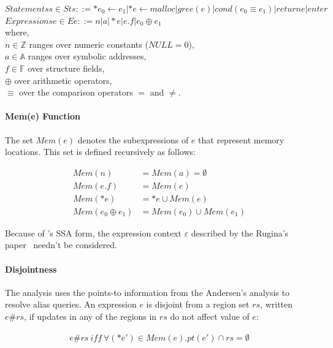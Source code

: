 $Statements s\in St s::= *e_0\gets e_1 | *e\gets malloc | gree(e) | 
cond(e_0\equiv e_1) | return e | enter$ \\

$Expressions e\in E e::= n | a | *e | e.f | e_0 \oplus e_1 $ \\

where, \\
$n\in \mathbb{Z}$ ranges over numeric constants ($NULL=0$), \\
$a\in \mathbb{A}$ ranges over symbolic addresses, \\
$f\in \mathbb{F}$ over structure fields, \\
$\oplus$ over arithmetic operators, \\
$\equiv$ over the comparison operators $=$ and $\ne$.

\paragraph{Mem(e) Function} 

The set $Mem(e)$ denotes the subexpressions of $e$ that represent memory 
locations. This set is defined recursively as follows:

\begin{align*}
  Mem(n) &= Mem(a)=\emptyset \\
Mem(e.f) &= Mem(e) \\
 Mem(*e) &={*e}\cup Mem(e) \\
Mem(e_0 \oplus e_1) &= Mem(e_0)\cup Mem(e_1)
\end{align*}


Because of \llvm's SSA form, the expression context $\varepsilon$ described 
by the Rugina's paper~\cite{rugina} needn't be considered.

\paragraph{Disjointness}

The analysis uses the points-to information from the Andersen's analysis 
to resolve alias queries. An expression $e$ is disjoint from a region set 
$rs$, written $e\#rs$, if updates in any of the regions in $rs$ do not 
affect value of $e$:

\begin{align*}
e\#rs \ iff \ \forall(*e')\in Mem(e). pt(e')\cap rs=\emptyset
\end{align*}



